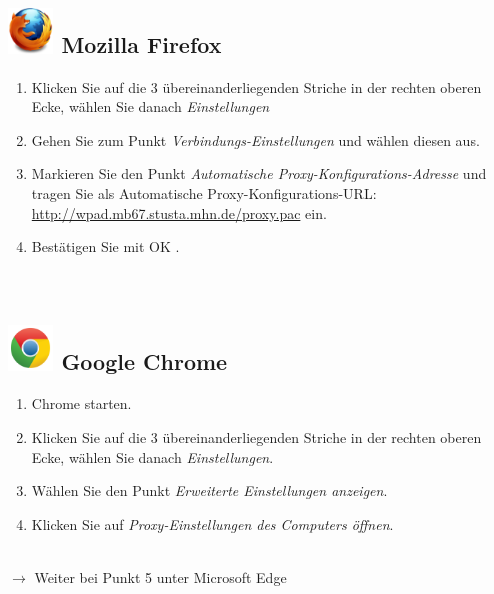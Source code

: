 \documentclass[a4paper,12pt]{scrartcl}
\begin{document}
\subsection*{\includegraphics[height=1.2cm,keepaspectratio]{Bilder/Firefox_35_logo} Mozilla Firefox}
\begin{enumerate}
	\item Klicken Sie auf die 3 übereinanderliegenden Striche in der rechten oberen Ecke, wählen Sie danach \emph{Einstellungen}
	\item Gehen Sie zum Punkt \emph{Verbindungs-Einstellungen} und wählen diesen aus.
	\item Markieren Sie den Punkt \emph{Automatische Proxy-Konfigurations-Adresse} und tragen Sie als Automatische Proxy-Konfigurations-URL: \\ \url{http://wpad.mb67.stusta.mhn.de/proxy.pac} ein.
	\item Bestätigen Sie mit OK .\\
	\\
	\\
\end{enumerate}





\subsection*{\includegraphics[height=1.2cm,keepaspectratio]{Bilder/Chrome_2011_logo} Google Chrome}
\begin{enumerate}
	\item Chrome starten.
	\item Klicken Sie auf die 3 übereinanderliegenden Striche in der rechten oberen Ecke, wählen Sie danach \emph{Einstellungen}.
	\item Wählen Sie den Punkt \emph{Erweiterte Einstellungen anzeigen}.
	\item Klicken Sie auf \emph{Proxy-Einstellungen des Computers öffnen}.
	\\
	\\
\end{enumerate}
$\rightarrow$ Weiter bei Punkt 5 unter Microsoft Edge
\end{document}
